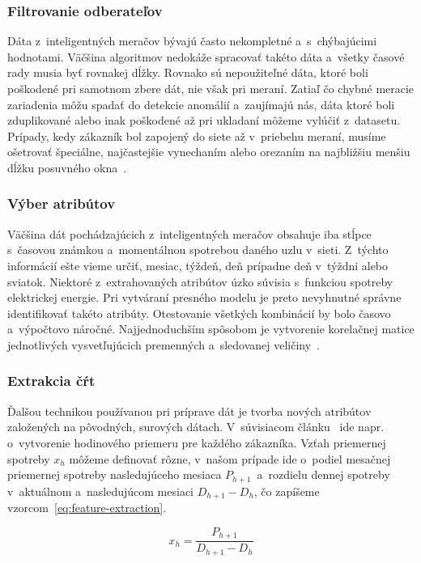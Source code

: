 \documentclass[a4paper,twoside,slovak,12pt,appendix]{article}
\begin{document}
\subsubsection{Filtrovanie odberateľov}
Dáta z~inteligentných meračov bývajú často nekompletné a~s~chýbajúcimi
hodnotami. Väčšina algoritmov nedokáže spracovať takéto dáta a~všetky časové
rady musia byť rovnakej dĺžky. Rovnako sú nepoužiteľné dáta, ktoré boli
poškodené pri samotnom zbere dát, nie však pri meraní. Zatiaľ čo chybné meracie
zariadenia môžu spadať do detekcie anomálií a~zaujímajú nás, dáta ktoré boli
zduplikované alebo inak poškodené až pri ukladaní môžeme vylúčiť z~datasetu.
Prípady, kedy zákazník bol zapojený do siete až v~priebehu meraní, musíme
ošetrovať špeciálne, najčastejšie vynechaním alebo orezaním na najbližšiu menšiu
dĺžku posuvného okna~\cite{Nagi2008}.

\subsubsection{Výber atribútov}
Väčšina dát pochádzajúcich z~inteligentných meračov obsahuje iba stĺpce
s~časovou známkou a~momentálnou spotrebou daného uzlu v~sieti. Z~týchto
informácií ešte vieme určiť, mesiac, týždeň, deň prípadne deň v~týždni alebo
sviatok. Niektoré z~extrahovaných atribútov úzko súvisia s~funkciou spotreby
elektrickej energie. Pri vytváraní presného modelu je preto nevyhnutné správne
identifikovať takéto atribúty. Otestovanie všetkých kombinácií by bolo časovo
a~výpočtovo náročné. Najjednoduchším spôsobom je vytvorenie korelačnej matice
jednotlivých vysvetľujúcich premenných a~sledovanej veličiny~\cite{Cody2015}.

\subsubsection{Extrakcia čŕt}
Ďalšou technikou používanou pri príprave dát je tvorba nových atribútov
založených na pôvodných, surových dátach. V~súvisiacom článku~\cite{Nagi2008}
ide napr. o~vytvorenie hodinového priemeru pre každého zákazníka. Vzťah
priemernej spotreby $x_h$ môžeme definovať rôzne, v~našom prípade ide o~podiel
mesačnej priemernej spotreby nasledujúceho mesiaca $P_{h+1}$~a~rozdielu dennej
spotreby v~aktuálnom a~nasledujúcom mesiaci $D_{h+1} - D_{h}$, čo zapíšeme
vzorcom~\ref{eq:feature-extraction}.

\begin{equation}
	\label{eq:feature-extraction}
  x_h = \frac{P_{h+1}}{D_{h+1} - D_{h}}
\end{equation}
\end{document}
